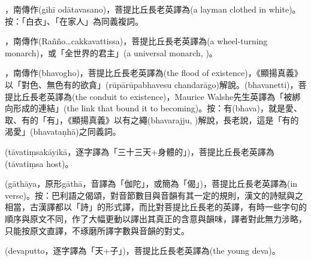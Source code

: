 \startitemgroup[noteitems]
\item{}，南傳作(gihī odātavasano)，菩提比丘長老英譯為(a layman clothed in white)。按：「白衣」、「在家人」為同義複詞。
\stopitemgroup

\startitemgroup[noteitems]
\item{}，南傳作(Rañño…cakkavattissa)，菩提比丘長老英譯為(a wheel-turning monarch)，或「全世界的君主」(a universal monarch, )。
\stopitemgroup

\startitemgroup[noteitems]
\item{}，南傳作(bhavogho)，菩提比丘長老英譯為(the flood of existence)，《顯揚真義》以「對色、無色有的欲貪」(rūpārūpabhavesu chandarāgo)解說。(bhavanetti)，菩提比丘長老英譯為(the conduit to existence)，Maurice Walshe先生英譯為「被綁向形成的連結」(the link that bound it to becoming)。按：有(bhava)，就是愛、取、有的「有」，《顯揚真義》以有之繩(bhavarajju, )解說，長老說，這是「有的渴愛」(bhavataṇhā)之同義詞。
\stopitemgroup

\startitemgroup[noteitems]
\item{}(tāvatiṃsakāyikā，逐字譯為「三十三天+身體的」)，菩提比丘長老英譯為(tāvatiṃsa host)。
\stopitemgroup

\startitemgroup[noteitems]
\item{}(gāthāya，原形gāthā，音譯為「伽陀」，或簡為「偈」)，菩提比丘長老英譯為(in verse)。按：巴利語之偈頌，對音節數目與音韻有其一定的規則，漢文的詩賦與之相當，古漢譯都以「詩」的形式譯，而比對菩提比丘長老的英譯，有時一些字句的順序與原文不同，作了大幅更動以譯出其真正的含意與韻味，譯者對此無力涉略，只能按原文直譯，不琢磨所譯字數與音韻的對丈。
\stopitemgroup

\startitemgroup[noteitems]
\item{}(devaputto，逐字譯為「天+子」)，菩提比丘長老英譯為(the young deva)。
\stopitemgroup

